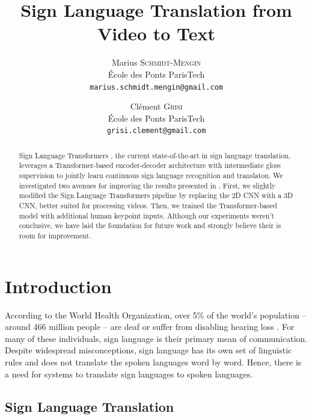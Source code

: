 \documentclass[final]{cvpr}
\begin{document}
\title{Sign Language Translation from Video to Text}

\author{Marius \textsc{Schmidt-Mengin}\\
	École des Ponts ParisTech\\
	{\tt\small marius.schmidt.mengin@gmail.com}
\and
Clément \textsc{Grisi}\\
École des Ponts ParisTech\\
{\tt\small grisi.clement@gmail.com}
}

\maketitle


\begin{abstract}
	Sign Language Transformers \cite{neccam}, the current state-of-the-art in sign language translation, leverages a Transformer-based encoder-decoder architecture with intermediate gloss supervision to jointly learn continuous sign language recognition and translaton. We investigated two avenues for improving the results presented in \cite{neccam}. First, we slightly modified the Sign Language Transformers pipeline by replacing the 2D CNN with a 3D CNN, better suited for processing videos. Then, we trained the Transformer-based model with additional human keypoint inputs. Although our experiments weren't conclusive, we have laid the foundation for future work and strongly believe their is room for improvement. 
\end{abstract}

\section{Introduction}
According to the World Health Organization, over 5\% of the world’s population -- around 466 million people – are deaf or suffer from disabling hearing loss \cite{WHO}. For many of these individuals, sign language is their primary mean of communication. Despite widespread misconceptions, sign language has its own set of linguistic rules and does not translate the spoken languages word by word. Hence, there is a need for systems to translate sign languages to spoken languages.

\subsection{Sign Language Translation}
\end{document}
